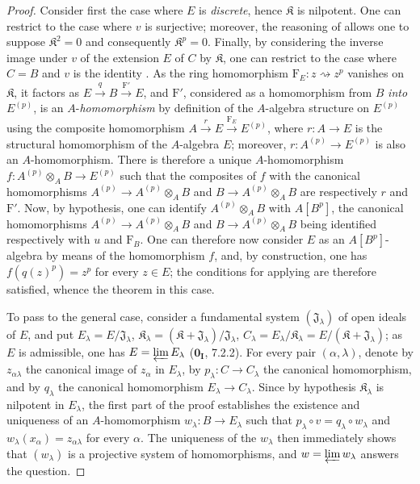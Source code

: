 \begin{proof}
Consider first the case where $E$ is \emph{discrete}, hence $\mathfrak K$ is nilpotent.
One can restrict to the case where $v$ is surjective; moreover, the reasoning of
 allows one to suppose $\mathfrak K^2=0$ and consequently
$\mathfrak K^p=0$. Finally, by considering the inverse image under $v$ of the
extension $E$ of $C$ by $\mathfrak K$, one can restrict to the case where $C=B$
and $v$ is the identity . As the ring homomorphism
$\mathrm{F}_E:z\rightsquigarrow z^p$ vanishes on $\mathfrak K$, it factors as
$E\xrightarrow q B\xrightarrow{\mathrm{F}'}E$, and $\mathrm{F}'$, considered as a
homomorphism from $B$ \emph{into} $E^{(p)}$, is an $A$-\emph{homomorphism} by definition
of the $A$-algebra structure on $E^{(p)}$ using the composite homomorphism
$A\xrightarrow r E\xrightarrow{\mathrm{F}_E}E^{(p)}$, where $r:A\to E$ is the
structural homomorphism of the $A$-algebra $E$; moreover,
$r:A^{(p)}\to E^{(p)}$ is also an $A$-homomorphism. There is therefore a unique
$A$-homomorphism $f:A^{(p)}\otimes_A B\to E^{(p)}$ such that the composites of $f$
with the canonical homomorphisms $A^{(p)}\to A^{(p)}\otimes_A B$ and
$B\to A^{(p)}\otimes_A B$ are respectively $r$ and $\mathrm{F}'$. Now, by hypothesis,
one can identify $A^{(p)}\otimes_A B$ with $A[B^p]$, the canonical homomorphisms
$A^{(p)}\to A^{(p)}\otimes_A B$ and $B\to A^{(p)}\otimes_A B$ being identified
respectively with $u$ and $\mathrm{F}_B$. One can therefore now consider $E$
as an $A[B^p]$-algebra by means of the homomorphism $f$, and, by construction,
one has $f(q(z)^p)=z^p$ for every $z\in E$; the conditions for applying
 are therefore satisfied, whence the theorem in this case.

To pass to the general case, consider a fundamental system
$(\mathfrak{J}_\lambda)$ of open ideals of $E$, and put
$E_\lambda=E/\mathfrak{J}_\lambda$,
$\mathfrak K_\lambda=(\mathfrak K+\mathfrak{J}_\lambda)/\mathfrak{J}_\lambda$,
$C_\lambda=E_\lambda/\mathfrak K_\lambda=E/(\mathfrak K+\mathfrak{J}_\lambda)$;
as $E$ is admissible, one has $E=\varprojlim E_\lambda$ ($\mathbf{0_I}$, 7.2.2).
For every pair $(\alpha,\lambda)$, denote by $z_{\alpha\lambda}$ the canonical
image of $z_\alpha$ in $E_\lambda$, by $p_\lambda:C\to C_\lambda$ the canonical
homomorphism,
and by $q_\lambda$ the canonical homomorphism $E_\lambda\to C_\lambda$.
Since by hypothesis $\mathfrak K_\lambda$ is nilpotent in $E_\lambda$, the first
part of the proof establishes the existence and uniqueness of an
$A$-homomorphism $w_\lambda:B\to E_\lambda$ such that
$p_\lambda\circ v=q_\lambda\circ w_\lambda$ and
$w_\lambda(x_\alpha)=z_{\alpha\lambda}$ for every $\alpha$.
The uniqueness of the $w_\lambda$ then immediately shows that $(w_\lambda)$ is a
projective system of homomorphisms, and $w=\varprojlim w_\lambda$ answers the
question.
\end{proof}

